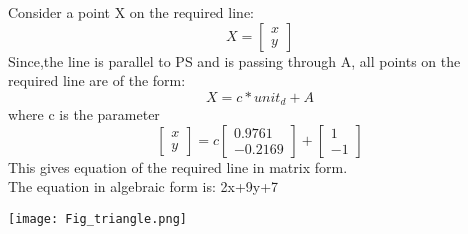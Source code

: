 \documentclass{beamer}
\begin{document}
\begin{frame}
Consider a point X on the required line:
\[
X=
\begin{bmatrix}
x\\
y
\end{bmatrix}
\]
Since,the line is parallel to PS and is passing through A,
all points on the required line are of the form:
\[
X=c*unit_d + A
\]
where c is the parameter
\[
\begin{bmatrix}
x\\
y
\end{bmatrix}
=c
\begin{bmatrix}
0.9761\\
-0.2169
\end{bmatrix}
+
\begin{bmatrix}
1\\
-1
\end{bmatrix}
\]
This gives equation of the required line in matrix form.\\
The equation in algebraic form is: 2x+9y+7
\end{frame}

\begin{frame}
 \texttt{[image: Fig\_triangle.png]}
\end{frame}
\end{document}
